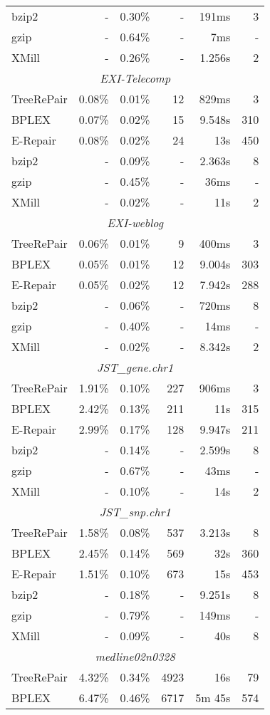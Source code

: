 \documentclass[12pt]{llncs}
\begin{document}
\begin{longtable}{lrrrrr}
			bzip2&-&0.30\%&-&191ms&3\\*
			gzip&-&0.64\%&-&7ms&-\\*
			XMill&-&0.26\%&-&1.256s&2\\
			\midrule\multicolumn{6}{c}{\emph{EXI-Telecomp}}\\*
			TreeRePair&0.08\%&0.01\%&12&829ms&3\\*
			BPLEX&0.07\%&0.02\%&15&9.548s&310\\*
			E-Repair&0.08\%&0.02\%&24&13s&450\\*
			bzip2&-&0.09\%&-&2.363s&8\\*
			gzip&-&0.45\%&-&36ms&-\\*
			XMill&-&0.02\%&-&11s&2\\
			\midrule\multicolumn{6}{c}{\emph{EXI-weblog}}\\*
			TreeRePair&0.06\%&0.01\%&9&400ms&3\\*
			BPLEX&0.05\%&0.01\%&12&9.004s&303\\*
			E-Repair&0.05\%&0.02\%&12&7.942s&288\\*
			bzip2&-&0.06\%&-&720ms&8\\*
			gzip&-&0.40\%&-&14ms&-\\*
			XMill&-&0.02\%&-&8.342s&2\\
			\midrule\multicolumn{6}{c}{\emph{JST\_gene.chr1}}\\*
			TreeRePair&1.91\%&0.10\%&227&906ms&3\\*
			BPLEX&2.42\%&0.13\%&211&11s&315\\*
			E-Repair&2.99\%&0.17\%&128&9.947s&211\\*
			bzip2&-&0.14\%&-&2.599s&8\\*
			gzip&-&0.67\%&-&43ms&-\\*
			XMill&-&0.10\%&-&14s&2\\
			\midrule\multicolumn{6}{c}{\emph{JST\_snp.chr1}}\\*
			TreeRePair&1.58\%&0.08\%&537&3.213s&8\\*
			BPLEX&2.45\%&0.14\%&569&32s&360\\*
			E-Repair&1.51\%&0.10\%&673&15s&453\\*
			bzip2&-&0.18\%&-&9.251s&8\\*
			gzip&-&0.79\%&-&149ms&-\\*
			XMill&-&0.09\%&-&40s&8\\
			\midrule\multicolumn{6}{c}{\emph{medline02n0328}}\\*
			TreeRePair&4.32\%&0.34\%&4923&16s&79\\*
			BPLEX&6.47\%&0.46\%&6717&5m 45s&574\\*

\end{longtable}
\end{document}
